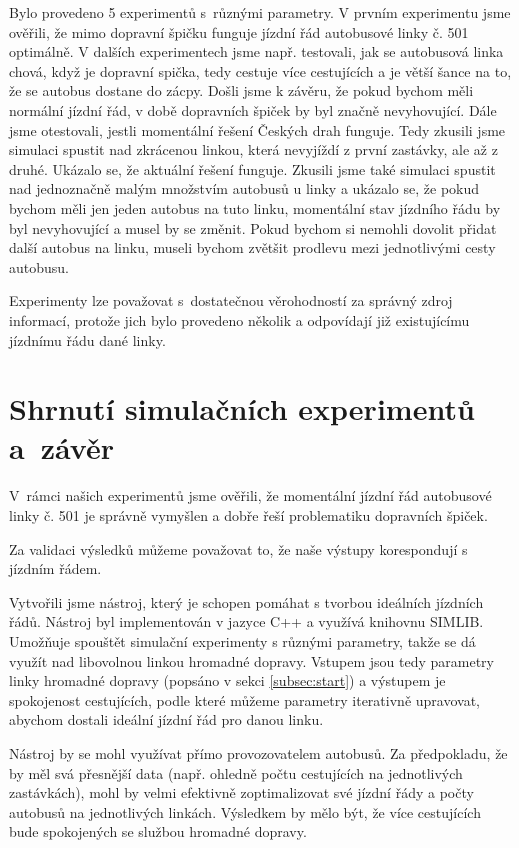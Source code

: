\documentclass[a4paper]{article}
\begin{document}
            Bylo provedeno 5 experimentů s~různými parametry. V prvním experimentu jsme ověřili, že mimo dopravní špičku funguje jízdní řád autobusové linky č. 501 optimálně. V dalších experimentech jsme např. testovali, jak se autobusová linka chová, když je dopravní spička, tedy cestuje více cestujících a je větší šance na to, že se autobus dostane do zácpy. Došli jsme k závěru, že pokud bychom měli normální jízdní řád, v době dopravních špiček by byl značně nevyhovující. Dále jsme otestovali, jestli momentální řešení Českých drah funguje. Tedy zkusili jsme simulaci spustit nad zkrácenou linkou, která nevyjíždí z první zastávky, ale až z druhé. Ukázalo se, že aktuální řešení funguje. Zkusili jsme také simulaci spustit nad jednoznačně malým množstvím autobusů u linky a ukázalo se, že pokud bychom měli jen jeden autobus na tuto linku, momentální stav jízdního řádu by byl nevyhovující a musel by se změnit. Pokud bychom si nemohli dovolit přidat další autobus na linku, museli bychom zvětšit prodlevu mezi jednotlivými cesty autobusu.
            
            
            Experimenty lze považovat s~dostatečnou věrohodností za správný zdroj informací, protože jich bylo provedeno několik a odpovídají již existujícímu jízdnímu řádu dané linky.
\newpage
    \section{Shrnutí simulačních experimentů a~závěr}
    \label{sec:summary}
            V~rámci našich experimentů jsme ověřili, že momentální jízdní řád autobusové linky č. 501 je správně vymyšlen a dobře řeší problematiku dopravních špiček.

            Za validaci výsledků můžeme považovat to, že naše výstupy korespondují s jízdním řádem.

            Vytvořili jsme nástroj, který je schopen pomáhat s tvorbou ideálních jízdních řádů. Nástroj byl implementován v jazyce C++ a využívá knihovnu SIMLIB. Umožňuje spouštět simulační experimenty s různými parametry, takže se dá využít nad libovolnou linkou hromadné dopravy. Vstupem jsou tedy parametry linky hromadné dopravy (popsáno v sekci \ref{subsec:start}) a výstupem je spokojenost cestujících, podle které můžeme parametry iterativně upravovat, abychom dostali ideální jízdní řád pro danou linku. 

            Nástroj by se mohl využívat přímo provozovatelem autobusů. Za předpokladu, že by měl svá přesnější data (např. ohledně počtu cestujících na jednotlivých zastávkách), mohl by velmi efektivně zoptimalizovat své jízdní řády a počty autobusů na jednotlivých linkách. Výsledkem by mělo být, že více cestujících bude spokojených se službou hromadné dopravy.
            


    \newpage

    \renewcommand{\refname}{Použitá literatura}
    
    
\end{document}
